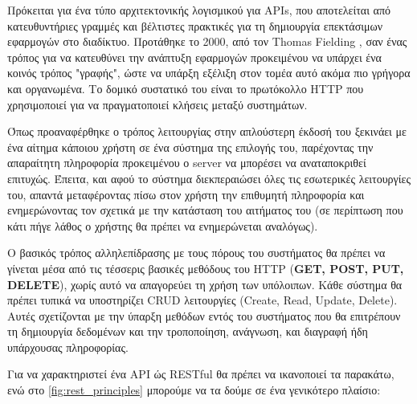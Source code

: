 Πρόκειται για ένα τύπο αρχιτεκτονικής λογισμικού για APIs, που αποτελείται από κατευθυντήριες γραμμές και βέλτιστες πρακτικές για τη δημιουργία επεκτάσιμων εφαρμογών στο διαδίκτυο.
Προτάθηκε το 2000, από τον Thomas Fielding \cite{rest_proposal}, σαν ένας τρόπος για να κατευθύνει την ανάπτυξη εφαρμογών 
προκειμένου να υπάρχει ένα κοινός τρόπος "γραφής", ώστε να υπάρξη εξέλιξη στον τομέα αυτό ακόμα πιο γρήγορα και οργανωμένα.  
Το δομικό συστατικό του είναι το πρωτόκολλο HTTP που χρησιμοποιεί για να πραγματοποιεί κλήσεις μεταξύ συστημάτων.

Όπως προαναφέρθηκε ο τρόπος λειτουργίας στην απλούστερη έκδοσή του ξεκινάει με ένα αίτημα κάποιου χρήστη
σε ένα σύστημα της επιλογής του, παρέχοντας την απαραίτητη πληροφορία προκειμένου ο server να μπορέσει να αναταποκριθεί επιτυχώς.
Έπειτα, και αφού το σύστημα διεκπεραιώσει όλες τις εσωτερικές λειτουργίες του, απαντά μεταφέροντας πίσω στον χρήστη
την επιθυμητή πληροφορία και ενημερώνοντας τον σχετικά με την κατάσταση του αιτήματος του (σε περίπτωση που κάτι πήγε λάθος ο χρήστης
θα πρέπει να ενημερώνεται αναλόγως).

Ο βασικός τρόπος αλληλεπίδρασης με τους πόρους του συστήματος θα πρέπει να γίνεται
μέσα από τις τέσσερις βασικές μεθόδους του HTTP (\textbf{GET, POST, PUT, DELETE}), χωρίς αυτό να απαγορεύει
τη χρήση των υπόλοιπων. Κάθε σύστημα θα πρέπει τυπικά να υποστηρίζει CRUD λειτουργίες (Create, Read, Update, Delete). Αυτές σχετίζονται
με την ύπαρξη μεθόδων εντός του συστήματος που θα επιτρέπουν τη δημιουργία δεδομένων και την τροποποίηση, ανάγνωση, και διαγραφή ήδη υπάρχουσας πληροφορίας. 

Για να χαρακτηριστεί ένα API ώς RESTful θα πρέπει να ικανοποιεί τα παρακάτω, ενώ
στο \autoref{fig:rest_principles} μπορούμε να τα δούμε σε ένα γενικότερο πλαίσιο:

